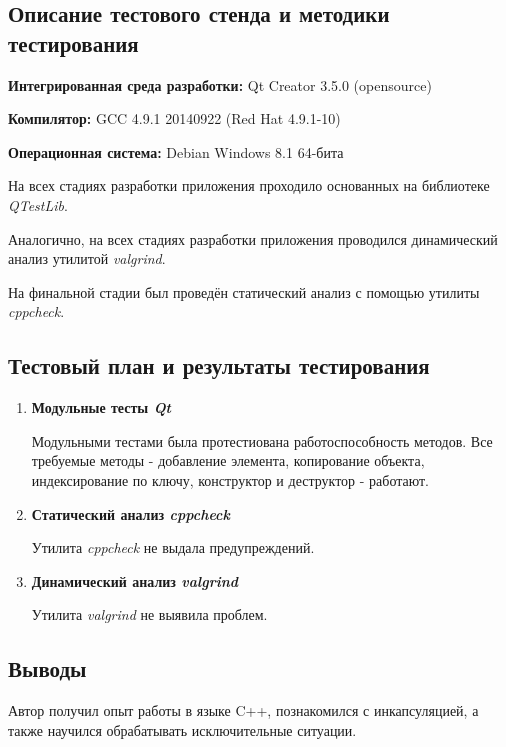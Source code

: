 \documentclass[12pt,a4paper]{report}
\begin{document}
\subsection{Описание тестового стенда и методики тестирования}

\begin{flushleft}
\textbf{Интегрированная среда разработки:} Qt Creator 3.5.0 (opensource)

\textbf{Компилятор:} GCC 4.9.1 20140922 (Red Hat 4.9.1-10)

\textbf{Операционная система:} Debian Windows 8.1 64-бита

\end{flushleft}

На всех стадиях разработки приложения проходило основанных на библиотеке  \textit{QTestLib}.

Аналогично, на всех стадиях разработки приложения проводился динамический анализ утилитой \textit{valgrind}.

На финальной стадии был проведён статический анализ с помощью утилиты \textit{cppcheck}.
\subsection{Тестовый план и результаты тестирования}
\hspace{\parindent}
\begin{enumerate}
\item \textbf{Модульные тесты \textit{Qt}}

Модульными тестами была протестиована работоспособность методов. Все требуемые методы - добавление элемента, копирование объекта, индексирование по ключу, конструктор и деструктор - работают.
\item \textbf{Статический анализ \textit{cppcheck}}

Утилита \textit{cppcheck} не выдала предупреждений.

\item \textbf{Динамический анализ \textit{valgrind}}

Утилита \textit{valgrind} не выявила проблем.
\end{enumerate}
\subsection{Выводы}
\hspace{\parindent}
Автор получил опыт работы в языке C++, познакомился с инкапсуляцией, а также научился обрабатывать исключительные ситуации.
\end{document}
